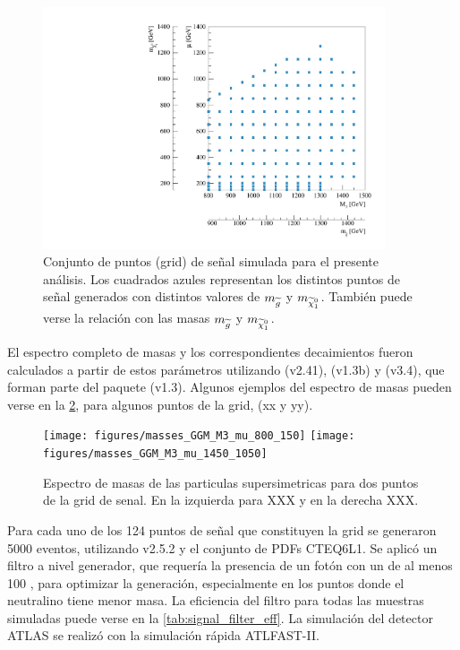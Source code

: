 \begin{figure}[!htb]
  \centering
  \includegraphics[width=0.9\textwidth]{figures/run1_grid}
  \caption{Conjunto de puntos (grid) de señal simulada para el presente análisis. Los cuadrados azules representan los distintos puntos
  de señal generados con distintos valores de $m_{\widetilde{g}}$ y $m_{\ninoone}$. También puede verse la relación con las masas $m_{\widetilde{g}}$ y $m_{\ninoone}$.}
  \label{fig:gridpoints}
\end{figure}


El espectro completo de masas y los correspondientes decaimientos fueron
calculados a partir de estos parámetros utilizando {\suspect}
(v2.41)\cite{Djouadi2007426}, {\sdecay} (v1.3b)\cite{Muhlleitner:2004mka} y
{\hdecay} (v3.4)\cite{Djouadi:1997yw}, que forman parte del paquete {\susyhit}
(v1.3)\cite{Djouadi:2006bz}. Algunos ejemplos del espectro de masas pueden verse
en la \cref{fig:mass_spectra}, para algunos puntos de la grid, (xx y yy).

\begin{figure}[!htb]
   \centering
   \texttt{[image: figures/masses\_GGM\_M3\_mu\_800\_150]}
   \texttt{[image: figures/masses\_GGM\_M3\_mu\_1450\_1050]}

   \caption{Espectro de masas de las particulas supersimetricas para dos puntos de la grid de senal.
     En la izquierda para XXX y en la derecha XXX.}
   \label{fig:mass_spectra}
\end{figure}

Para cada uno de los 124 puntos de señal que constituyen la grid se generaron
5000 eventos, utilizando {\herwigpp} v2.5.2\cite{Bahr:2008pv} y el conjunto de
PDFs CTEQ6L1\cite{Nadolsky:2008zw}. Se aplicó un filtro a nivel generador, que
requería la presencia de un fotón con un {\pt} de al menos 100 \gev, para
optimizar la generación, especialmente en los puntos donde el
neutralino tiene menor masa. La eficiencia del filtro para todas las muestras
simuladas puede verse en la \cref{tab:signal_filter_eff}. La simulación del
detector ATLAS se realizó con la simulación rápida
\textsc{ATLFAST-II}\cite{Richter-Was:683751}.


